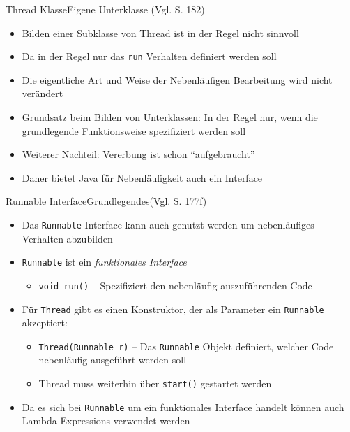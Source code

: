 \begin{frame}{Thread Klasse}{Eigene Unterklasse (Vgl. \cite{ullenboom2014java} S. 182)}
    \begin{itemize}
        \item Bilden einer Subklasse von Thread ist in der Regel nicht sinnvoll
        \item Da in der Regel nur das \texttt{run} Verhalten definiert werden soll
        \item Die eigentliche Art und Weise der Nebenläufigen Bearbeitung wird nicht verändert
        \item Grundsatz beim Bilden von Unterklassen: In der Regel nur, wenn die grundlegende Funktionsweise spezifiziert werden soll
        \item Weiterer Nachteil: Vererbung ist schon "`aufgebraucht"'
        \item Daher bietet Java für Nebenläufigkeit auch ein Interface
    \end{itemize}
\end{frame}

\begin{frame}{Runnable Interface}{Grundlegendes(Vgl. \cite{ullenboom2014java} S. 177f)}
    \begin{itemize}
        \item Das \texttt{Runnable} Interface kann auch genutzt werden um nebenläufiges Verhalten abzubilden
        \item \texttt{Runnable} ist ein \textit{funktionales Interface}
        \begin{itemize}
            \item \texttt{void run()} -- Spezifiziert den nebenläufig auszuführenden Code
        \end{itemize}
        \item Für \texttt{Thread} gibt es einen Konstruktor, der als Parameter ein \texttt{Runnable} akzeptiert:
        \begin{itemize}
            \item \texttt{Thread(Runnable r)} -- Das \texttt{Runnable} Objekt definiert, welcher Code nebenläufig ausgeführt werden soll
            \item Thread muss weiterhin über \texttt{start()} gestartet werden
        \end{itemize}
        \item Da es sich bei \texttt{Runnable} um ein funktionales Interface handelt können auch Lambda Expressions verwendet werden
    \end{itemize}
\end{frame}

